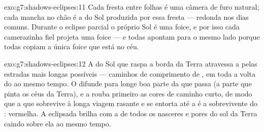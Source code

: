 \begin{solution}{exo:g7:shadows-eclipses:11}
Cada fresta entre folhas é uma câmera de furo natural; cada mancha no
chão é a  do Sol produzida por essa fresta --- redonda nos dias
comuns. Durante o eclipse parcial o próprio Sol é uma foice, e por
isso cada camerazinha fiel projeta uma foice --- e todas apontam para
o mesmo lado porque todas copiam a única foice que está no céu.
\end{solution}

\begin{solution}{exo:g7:shadows-eclipses:12}
A  do Sol que raspa a borda da Terra atravessa a  pelas
estradas mais longas possíveis --- caminhos de comprimento de , em toda a volta do  ao mesmo tempo. O  difunde para
longe boa parte da  que passa (a parte que pinta os céus da
Terra), e a  rouba primeiro as cores de caminho curto, de modo
que a  que sobrevive à longa viagem rasante e se entorta até a 
é a sobrevivente do : vermelha. A  eclipsada brilha com
a  de todos os nasceres e pores do sol da Terra caindo sobre ela
ao mesmo tempo.
\end{solution}

